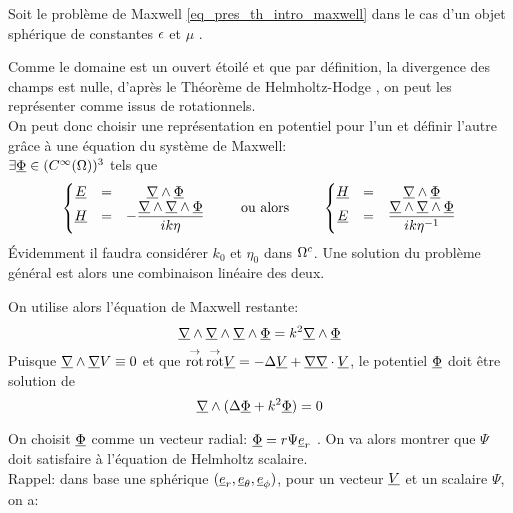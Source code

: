 Soit le problème de Maxwell \eqref{eq_pres_th_intro_maxwell} dans le cas d'un objet sphérique de constantes $\epsilon$ et $\mu$%
.

Comme le domaine est un ouvert étoilé et que par définition, la divergence des champs est nulle, d'après le Théorème de Helmholtz-Hodge \cite{gui_rigorous_2007}, on peut les représenter comme issus de rotationnels.\\
On peut donc choisir une représentation en potentiel pour l'un et définir l'autre grâce à une équation du système de Maxwell:\\
 $\exists \underline{\Phi} \in (C^\infty(\Omega))^3$ tels que
\begin{equation}
  \label{eq_sol_maxwell_pot_hertz}
  \left\lbrace\begin{matrix}
    \underline{E} &=& \underline{\nabla} \wedge \underline{\Phi} \\
    \underline{H} &=& - \dfrac{\underline{\nabla} \wedge \underline{\nabla} \wedge \underline{\Phi}}{ik\eta}
  \end{matrix} \right.
  \qquad \text{ ou alors } \qquad
  \left\lbrace\begin{matrix}
    \underline{H} &=& \underline{\nabla} \wedge \underline{\Phi}\\
    \underline{E} &=& \dfrac{\underline{\nabla} \wedge \underline{\nabla} \wedge \underline{\Phi}}{ik\eta^{-1}}\\
  \end{matrix}\right.
\end{equation}
Évidemment il faudra considérer $k_0$ et $\eta_0$ dans $\Omega^c$. Une solution du problème général est alors une combinaison linéaire des deux.

On utilise alors l'équation de Maxwell restante:
\[
    \underline{\nabla} \wedge \underline{\nabla} \wedge \underline{\nabla} \wedge \underline{\Phi} = k^2 \underline{\nabla} \wedge \underline{\Phi} \\
\]
Puisque $\underline{\nabla} \wedge  \underline{\nabla}  V  \equiv 0$ et que ${{\overset{\rightarrow}{\operatorname{rot}}}}\, {{\overset{\rightarrow}{\operatorname{rot}}}} \underline{V} = -\Delta \underline{V} + \underline{\nabla} \underline{\nabla} \cdot \underline{V}$, le potentiel $\underline{\Phi}$ doit être solution de 
\begin{equation}
  \label{eq_sol_maxwell_helmholtz_vect}
  \underline{\nabla} \wedge ( \Delta \underline{\Phi} + k^2 \underline{\Phi} ) = 0
\end{equation}

On choisit $\underline{\Phi}$ comme un vecteur radial: $\underline{\Phi} = r \Psi \underline{e}_r$ \cite[p.~84]{bohren_absorption_2004}. On va alors montrer que $\Psi$ doit satisfaire à l'équation de Helmholtz scalaire.\\

Rappel: dans base une sphérique $(\underline{e}_r, \underline{e}_\theta, \underline{e}_\phi)$, pour 
un vecteur $\underline{V}$ 
et un scalaire $\Psi$, on a:

